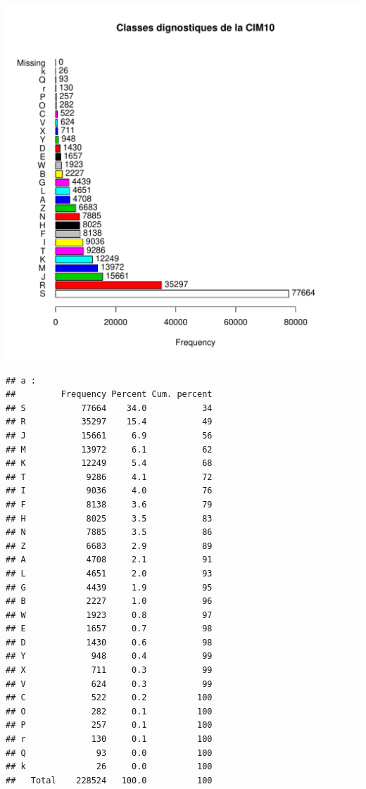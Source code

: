 \documentclass[12pt,english,french,twoside]{book}\usepackage[]{graphicx}\usepackage[]{color}
\makeatletter
\def\maxwidth{ %
  \ifdim\Gin@nat@width>\linewidth
    \linewidth
  \else
    \Gin@nat@width
  \fi
}
\newenvironment{kframe}{%
 \def\at@end@of@kframe{}%
 \ifinner\ifhmode%
  \def\at@end@of@kframe{\end{minipage}}%
  \begin{minipage}{\columnwidth}%
 \fi\fi%
 \def\FrameCommand##1{\hskip\@totalleftmargin \hskip-\fboxsep
 \colorbox{shadecolor}{##1}\hskip-\fboxsep
     \hskip-\linewidth \hskip-\@totalleftmargin \hskip\columnwidth}%
 \MakeFramed {\advance\hsize-\width
   \@totalleftmargin\z@ \linewidth\hsize
   \@setminipage}}%
 {\par\unskip\endMakeFramed%
 \at@end@of@kframe}
\newenvironment{knitrout}{}{} %
\makeatother
\begin{document}
\begin{knitrout}
\color{fgcolor}
\includegraphics[width=\maxwidth]{figure/class_cim10} 
\begin{kframe}\begin{verbatim}
## a :  
##         Frequency Percent Cum. percent
## S           77664    34.0           34
## R           35297    15.4           49
## J           15661     6.9           56
## M           13972     6.1           62
## K           12249     5.4           68
## T            9286     4.1           72
## I            9036     4.0           76
## F            8138     3.6           79
## H            8025     3.5           83
## N            7885     3.5           86
## Z            6683     2.9           89
## A            4708     2.1           91
## L            4651     2.0           93
## G            4439     1.9           95
## B            2227     1.0           96
## W            1923     0.8           97
## E            1657     0.7           98
## D            1430     0.6           98
## Y             948     0.4           99
## X             711     0.3           99
## V             624     0.3           99
## C             522     0.2          100
## O             282     0.1          100
## P             257     0.1          100
## r             130     0.1          100
## Q              93     0.0          100
## k              26     0.0          100
##   Total    228524   100.0          100
\end{verbatim}
\end{kframe}
\end{knitrout}
\end{document}
